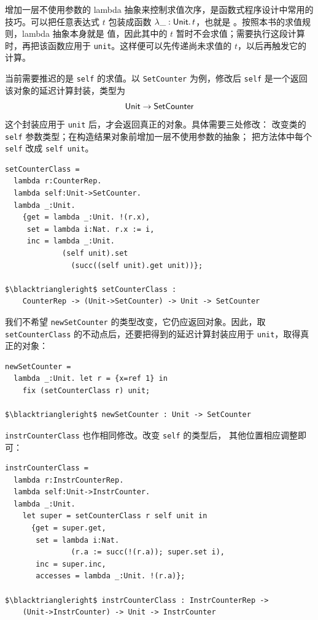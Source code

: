 增加一层不使用参数的 lambda 抽象来控制求值次序，是函数式程序设计中常用的
技巧。可以把任意表达式 \(t\) 包装成函数
\(\lambda\_:\mathsf{Unit}.\,t\)，也就是
。按照本书的求值规则，lambda 抽象本身就是
值，因此其中的 \(t\) 暂时不会求值；需要执行这段计算时，再把该函数应用于
\texttt{unit}。这样便可以先传递尚未求值的 \(t\)，以后再触发它的计算。

当前需要推迟的是 \texttt{self} 的求值。以 \texttt{SetCounter} 为例，修改后
\texttt{self} 是一个返回该对象的延迟计算封装，类型为
\[
\mathsf{Unit}\to\mathsf{SetCounter}
\]
这个封装应用于 \texttt{unit} 后，才会返回真正的对象。具体需要三处修改：
改变类的 \texttt{self} 参数类型；在构造结果对象前增加一层不使用参数的抽象；
把方法体中每个 \texttt{self} 改成 \texttt{self unit}。

\begin{lstlisting}[mathescape=true]
setCounterClass =
  lambda r:CounterRep.
  lambda self:Unit->SetCounter.
  lambda _:Unit.
    {get = lambda _:Unit. !(r.x),
     set = lambda i:Nat. r.x := i,
     inc = lambda _:Unit.
             (self unit).set
               (succ((self unit).get unit))};

$\blacktriangleright$ setCounterClass :
    CounterRep -> (Unit->SetCounter) -> Unit -> SetCounter
\end{lstlisting}

我们不希望 \texttt{newSetCounter} 的类型改变，它仍应返回对象。因此，取
\texttt{setCounterClass} 的不动点后，还要把得到的延迟计算封装应用于
\texttt{unit}，取得真正的对象：

\begin{lstlisting}[mathescape=true]
newSetCounter =
  lambda _:Unit. let r = {x=ref 1} in
    fix (setCounterClass r) unit;

$\blacktriangleright$ newSetCounter : Unit -> SetCounter
\end{lstlisting}

\texttt{instrCounterClass} 也作相同修改。改变 \texttt{self} 的类型后，
其他位置相应调整即可：

\begin{lstlisting}[mathescape=true]
instrCounterClass =
  lambda r:InstrCounterRep.
  lambda self:Unit->InstrCounter.
  lambda _:Unit.
    let super = setCounterClass r self unit in
      {get = super.get,
       set = lambda i:Nat.
               (r.a := succ(!(r.a)); super.set i),
       inc = super.inc,
       accesses = lambda _:Unit. !(r.a)};

$\blacktriangleright$ instrCounterClass : InstrCounterRep ->
    (Unit->InstrCounter) -> Unit -> InstrCounter
\end{lstlisting}

